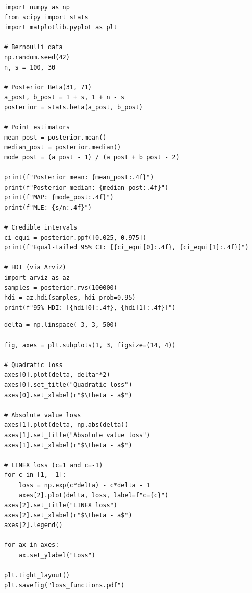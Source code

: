 \begin{codeblock}[title=\textbf{Bayesian estimation and credible intervals}]
\begin{verbatim}
import numpy as np
from scipy import stats
import matplotlib.pyplot as plt

# Bernoulli data
np.random.seed(42)
n, s = 100, 30

# Posterior Beta(31, 71)
a_post, b_post = 1 + s, 1 + n - s
posterior = stats.beta(a_post, b_post)

# Point estimators
mean_post = posterior.mean()
median_post = posterior.median()
mode_post = (a_post - 1) / (a_post + b_post - 2)

print(f"Posterior mean: {mean_post:.4f}")
print(f"Posterior median: {median_post:.4f}")
print(f"MAP: {mode_post:.4f}")
print(f"MLE: {s/n:.4f}")

# Credible intervals
ci_equi = posterior.ppf([0.025, 0.975])
print(f"Equal-tailed 95% CI: [{ci_equi[0]:.4f}, {ci_equi[1]:.4f}]")

# HDI (via ArviZ)
import arviz as az
samples = posterior.rvs(100000)
hdi = az.hdi(samples, hdi_prob=0.95)
print(f"95% HDI: [{hdi[0]:.4f}, {hdi[1]:.4f}]")
\end{verbatim}
\end{codeblock}

\begin{codeblock}[title=\textbf{Comparing loss functions}]
\begin{verbatim}
delta = np.linspace(-3, 3, 500)

fig, axes = plt.subplots(1, 3, figsize=(14, 4))

# Quadratic loss
axes[0].plot(delta, delta**2)
axes[0].set_title("Quadratic loss")
axes[0].set_xlabel(r"$\theta - a$")

# Absolute value loss
axes[1].plot(delta, np.abs(delta))
axes[1].set_title("Absolute value loss")
axes[1].set_xlabel(r"$\theta - a$")

# LINEX loss (c=1 and c=-1)
for c in [1, -1]:
    loss = np.exp(c*delta) - c*delta - 1
    axes[2].plot(delta, loss, label=f"c={c}")
axes[2].set_title("LINEX loss")
axes[2].set_xlabel(r"$\theta - a$")
axes[2].legend()

for ax in axes:
    ax.set_ylabel("Loss")

plt.tight_layout()
plt.savefig("loss_functions.pdf")
\end{verbatim}
\end{codeblock}

